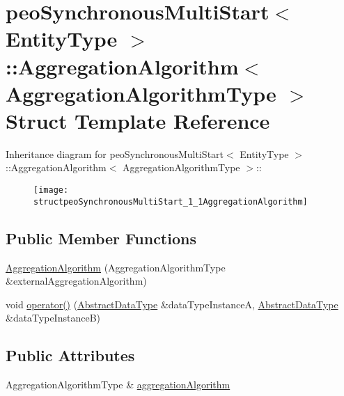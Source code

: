 \hypertarget{structpeoSynchronousMultiStart_1_1AggregationAlgorithm}{
\section{peo\-Synchronous\-Multi\-Start$<$ Entity\-Type $>$::Aggregation\-Algorithm$<$ Aggregation\-Algorithm\-Type $>$ Struct Template Reference}
\label{structpeoSynchronousMultiStart_1_1AggregationAlgorithm}
}
Inheritance diagram for peo\-Synchronous\-Multi\-Start$<$ Entity\-Type $>$::Aggregation\-Algorithm$<$ Aggregation\-Algorithm\-Type $>$::\begin{figure}[H]
\begin{center}
\leavevmode
\texttt{[image: structpeoSynchronousMultiStart\_1\_1AggregationAlgorithm]}
\end{center}
\end{figure}
\subsection*{Public Member Functions}
\begin{CompactItemize}
\item 
\hypertarget{structpeoSynchronousMultiStart_1_1AggregationAlgorithm_1e03bf7728d19f4649366238962ca365}{
\hyperlink{structpeoSynchronousMultiStart_1_1AggregationAlgorithm_1e03bf7728d19f4649366238962ca365}{Aggregation\-Algorithm} (Aggregation\-Algorithm\-Type \&external\-Aggregation\-Algorithm)}
\label{structpeoSynchronousMultiStart_1_1AggregationAlgorithm_1e03bf7728d19f4649366238962ca365}

\item 
\hypertarget{structpeoSynchronousMultiStart_1_1AggregationAlgorithm_f8abe94db942aa42f0e3d9c1657db581}{
void \hyperlink{structpeoSynchronousMultiStart_1_1AggregationAlgorithm_f8abe94db942aa42f0e3d9c1657db581}{operator()} (\hyperlink{structpeoSynchronousMultiStart_1_1AbstractDataType}{Abstract\-Data\-Type} \&data\-Type\-Instance\-A, \hyperlink{structpeoSynchronousMultiStart_1_1AbstractDataType}{Abstract\-Data\-Type} \&data\-Type\-Instance\-B)}
\label{structpeoSynchronousMultiStart_1_1AggregationAlgorithm_f8abe94db942aa42f0e3d9c1657db581}

\end{CompactItemize}
\subsection*{Public Attributes}
\begin{CompactItemize}
\item 
\hypertarget{structpeoSynchronousMultiStart_1_1AggregationAlgorithm_3c701a64f21aa00278c58b5b4ac914a1}{
Aggregation\-Algorithm\-Type \& \hyperlink{structpeoSynchronousMultiStart_1_1AggregationAlgorithm_3c701a64f21aa00278c58b5b4ac914a1}{aggregation\-Algorithm}}
\label{structpeoSynchronousMultiStart_1_1AggregationAlgorithm_3c701a64f21aa00278c58b5b4ac914a1}

\end{CompactItemize}


